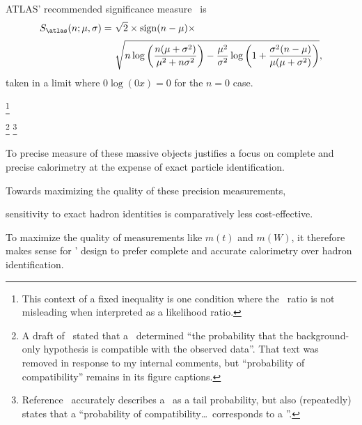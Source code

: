 ATLAS' recommended significance measure~\cite{atlas_significance} is
\begin{align}
\label{eqn:significance_atlas}
S_\mathrm{\atlas}(n; \mu, \sigma) =~&
\sqrt{2} \times
\mathrm{sign}(n - \mu) \times
\\[0.2em] \nonumber
&
\sqrt{
n\log\left(\frac{n(\mu + \sigma^2)}{\mu^2 + n\sigma^2}\right)
- \frac{\mu^2}{\sigma^2}\log\left(
1 + \frac{\sigma^2(n - \mu)}{\mu(\mu + \sigma^2)}
\right)
}
,
\end{align}
taken in a limit where $0\log(0x) = 0$ for the $n=0$ case.


%
\footnote{%
This context of a fixed inequality is one condition where the
\pvalue\ ratio is not misleading when interpreted as a likelihood ratio.%
}


%
\footnote{%
A draft of~\cite{HIGG-2018-51} stated that a \pvalue\ determined
``the probability that the background-only hypothesis is compatible with the
observed data''.
That text was removed in response to my internal comments, but
``probability of compatibility'' remains in its figure captions.%
}%
\footnote{%
Reference~\cite{HIGG-2018-57} accurately describes a \pvalue\ as a tail
probability, but also (repeatedly) states that a
``probability of compatibility\ldots\ corresponds to a \pvalue''.%
}%




To precise measure of these massive objects
justifies a focus on complete and precise calorimetry
at the expense of exact particle identification.



Towards maximizing the quality of these precision measurements,


sensitivity to
exact hadron identities is comparatively less cost-effective.%


To maximize the quality of measurements like $m(t)$ and $m(W)$, it therefore
makes sense for \atlas' design to prefer complete and accurate calorimetry over
hadron identification.

